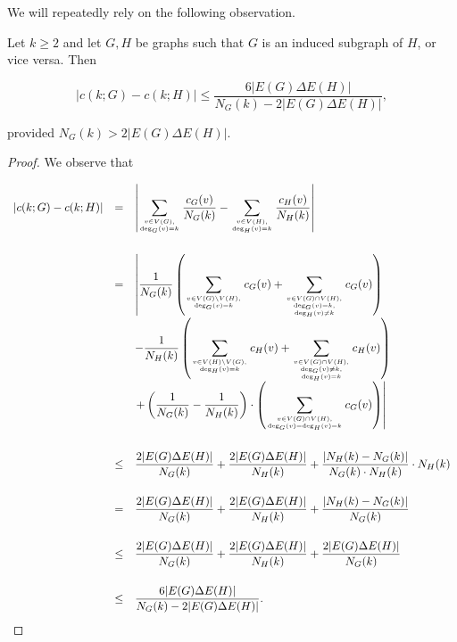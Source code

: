 We will repeatedly rely on the following observation.

\begin{lemma}\label{lem:ckGckH}
Let $k\geq 2$ and let $G, H$ be graphs such that $G$ is an induced subgraph of $H$, or vice versa.
Then

$$ \left| c(k;G) - c(k;H) \right| \leq \frac{6|E(G)\Delta E(H)|}{N_G(k) - 2|E(G)\Delta E(H)|}, $$

\noindent
provided $N_G(k) > 2|E(G)\Delta E(H)|$.
\end{lemma}

\begin{proof} 
We observe that
 
$$ \begin{array}{rcl} 
|c(k; G)-c(k;H)| 
& = & \displaystyle
\left| \sum_{v\in V(G), \atop\text{deg}_G(v)=k} \frac{c_G(v)}{N_G(k)} - 
\sum_{v\in V(H), \atop\text{deg}_{H}(v)=k} \frac{c_{H}(v)}{N_{H}(k)} \right| \\[8ex]
& = & \displaystyle 
\left| \frac{1}{N_G(k)} \left( \sum_{v\in V(G)\setminus V(H), \atop\text{deg}_G(v)=k} c_G(v)
+ \sum_{v\in V(G)\cap V(H), \atop{\text{deg}_G(v)=k, \atop\text{deg}_{H}(v)\neq k}} c_G(v) \right) \right. \\
& & \displaystyle
- \frac{1}{N_{H}(k)} \left(\sum_{v\in V(H)\setminus V(G), \atop\text{deg}_{H}(v)=k} c_{H}(v)
+ \sum_{v\in V(G)\cap V(H), \atop{\text{deg}_G(v)\neq k, \atop\text{deg}_{H}(v)=k}} c_{H}(v) \right) \\
& & \displaystyle  
\left. + \left(\frac{1}{N_G(k)}-\frac{1}{N_{H}(k)} \right) \cdot 
\left( \sum_{v \in V(G)\cap V(H), \atop\text{deg}_G(v)=\text{deg}_{H}(v)=k}
c_G(v) \right) \right| \\[8ex]
 & \leq & \displaystyle
 \frac{2|E(G)\Delta E(H)|}{N_G(k)} + \frac{2|E(G)\Delta E(H)|}{N_{H}(k)} + 
 \frac{|N_{H}(k) - N_G(k)|}{N_G(k)\cdot N_{H}(k)} \cdot N_{H}(k) \\[5ex]
 & = & \displaystyle 
 \frac{2|E(G)\Delta E(H)|}{N_G(k)} + \frac{2|E(G)\Delta E(H)|}{N_{H}(k)} + \frac{|N_{H}(k) - N_G(k)|}{N_G(k)} \\[5ex]
 & \leq & \displaystyle
 \frac{2|E(G)\Delta E(H)|}{N_G(k)} + \frac{2|E(G)\Delta E(H)|}{N_{H}(k)} + \frac{2|E(G)\Delta E(H)|}{N_G(k)} \\[5ex]
 & \leq & \displaystyle
\frac{6 |E(G)\Delta E(H)|}{N_G(k)-2|E(G)\Delta E(H)|}.
\end{array} $$


\end{proof}
